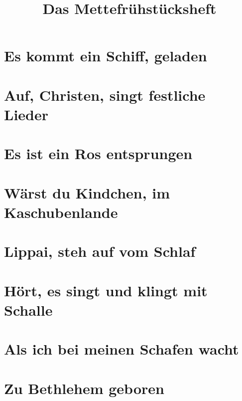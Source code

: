 \documentclass[10pt]{article}
\title{Das Mettefrühstücksheft}
\begin{document}
\maketitle
\newpage
\tableofcontents
\newpage
\section{Es kommt ein Schiff, geladen}

\section{Auf, Christen, singt festliche Lieder}

\section{Es ist ein Ros entsprungen}

\section{Wärst du Kindchen, im Kaschubenlande}
\section{Lippai, steh auf vom Schlaf}

\section{Hört, es singt und klingt mit Schalle}

\section{Als ich bei meinen Schafen wacht}

\section{Zu Bethlehem geboren}
\end{document}
